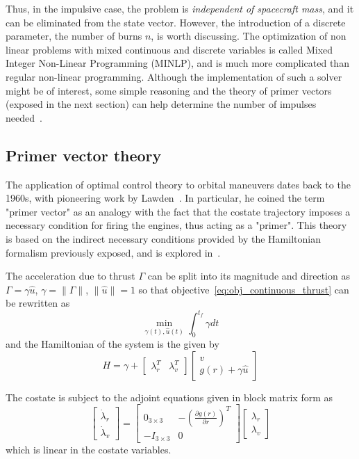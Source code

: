 Thus, in the impulsive case, the problem is \textit{independent of spacecraft mass}, and it can be eliminated from the state vector. However, the introduction of a discrete parameter, the number of burns \(n\), is worth discussing. The optimization of non linear problems with mixed continuous and discrete variables is called Mixed Integer Non-Linear Programming (MINLP), and is much more complicated than regular non-linear programming. Although the implementation of such a solver might be of interest, some simple reasoning and the theory of primer vectors (exposed in the next section) can help determine the number of impulses needed~\cite{interactive_primer_vector}.

\subsection{Primer vector theory}

The application of optimal control theory to orbital maneuvers dates back to the 1960s, with pioneering work by Lawden~\cite{Conway_2010}. In particular, he coined the term "primer vector"  as an analogy with the fact that the costate trajectory imposes a necessary condition for firing the engines, thus acting as a "primer". This theory is based on the indirect necessary conditions provided by the Hamiltonian formalism previously exposed, and is explored in~\cite{Conway_2010}.

The acceleration due to thrust \(\Gamma \) can be split into its magnitude and direction as \(\Gamma = \gamma \hat u\), \(\gamma = \lVert \Gamma \rVert\), \(\lVert \hat u \rVert = 1\) so that objective~\eqref{eq:obj_continuous_thrust} can be rewritten as
\begin{equation}
    \min_{\gamma(t), \hat u(t)} \int_0^{t_f} \gamma dt
\end{equation}
and the Hamiltonian of the system is the given by
\begin{equation}
    H = \gamma + \begin{bmatrix}
        \lambda_r^T & \lambda_v^T
    \end{bmatrix} \begin{bmatrix}
        v \\ g(r) + \gamma \hat u
    \end{bmatrix}
\end{equation}

The costate is subject to the adjoint equations given in block matrix form as
\begin{equation}
    \begin{bmatrix}
        \dot \lambda_r \\ \dot \lambda_v
    \end{bmatrix} = \begin{bmatrix}
        0_{3\times3} & -\left(\frac{\partial g(r)}{\partial r}\right)^T \\
        -I_{3\times3} & 0
    \end{bmatrix} \begin{bmatrix}
        \lambda_r \\ \lambda_v
    \end{bmatrix}
\end{equation}
which is linear in the costate variables. 

